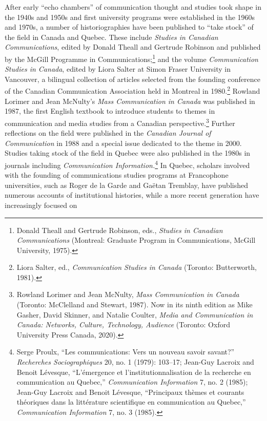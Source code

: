\documentclass{tufte-handout}
\begin{document}
After early ``echo chambers'' of communication thought and studies took
shape in the 1940s and 1950s and first university programs were
established in the 1960s and 1970s, a number of historiographies have
been published to ``take stock'' of the field in Canada and Quebec.
These include \emph{Studies in Canadian Communications}, edited by
Donald Theall and Gertrude Robinson and published by the McGill
Programme in Communications;\footnote{Donald Theall and Gertrude
  Robinson, eds., \emph{Studies in Canadian Communications} (Montreal:
  Graduate Program in Communications, McGill University, 1975).} and the
volume \emph{Communication Studies in Canada}, edited by Liora Salter at
Simon Fraser University in Vancouver, a bilingual collection of articles
selected from the founding conference of the Canadian Communication
Association held in Montreal in 1980.\footnote{Liora Salter, ed.,
  \emph{Communication Studies in Canada} (Toronto: Butterworth, 1981).}
Rowland Lorimer and Jean McNulty's \emph{Mass Communication in Canada}
was published in 1987, the first English textbook to introduce students
to themes in communication and media studies from a Canadian
perspective.\footnote{Rowland Lorimer and Jean McNulty, \emph{Mass
  Communication in Canada} (Toronto: McClelland and Stewart, 1987). Now
  in its ninth edition as Mike Gasher, David Skinner, and Natalie
  Coulter, \emph{Media and Communication in Canada: Networks, Culture,
  Technology, Audience} (Toronto: Oxford University Press Canada, 2020).}
Further reflections on the field were published in the \emph{Canadian
Journal of Communication} in 1988 and a special issue dedicated to the
theme in 2000. Studies taking stock of the field in Quebec were also
published in the 1980s in journals including \emph{Communication
Information.}\footnote{Serge Proulx, ``Les communications: Vers un
  nouveau savoir savant?'' \emph{Recherches Sociographiques} 20, no. 1
  (1979): 103--17; Jean-Guy Lacroix and Benoit Lévesque, ``L'émergence
  et l'institutionnalisation de la recherche en communication au
  Quebec,'' \emph{Communication Information} 7, no. 2 (1985); Jean-Guy
  Lacroix and Benoit Lévesque, ``Principaux thèmes et courants
  théoriques dans la littérature scientifique en communication au
  Quebec,'' \emph{Communication Information} 7, no. 3 (1985).} In
Quebec, scholars involved with the founding of communications studies
programs at Francophone universities, such as Roger de la Garde and
Gaëtan Tremblay, have published numerous accounts of institutional
histories, while a more recent generation have increasingly focused on
\end{document}

